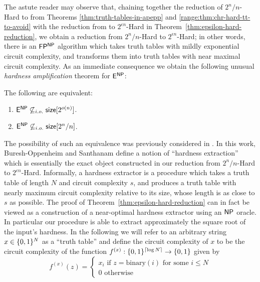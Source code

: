 The astute reader may observe that, chaining together the reduction of {\sc $2^{n}/n$-Hard} to \avoid from Theorems \ref{thm:truth-tables-in-apepp} and \ref{range:thm:chr-hard-tt-to-avoid} with the reduction from \avoid to {\sc $2^{\epsilon n}$-Hard} in Theorem~\ref{thm:epsilon-hard-reduction}, we obtain a reduction from {\sc $2^{n}/n$-Hard} to {\sc $2^{\epsilon n}$-Hard}; in other words, there is an $\cl{FP^{NP}}$ algorithm which takes truth tables with mildly exponential circuit complexity, and transforms them into truth tables with near maximal circuit complexity. As an immediate consequence we obtain the following unusual \emph{hardness amplification} theorem for $\cl{E^{NP}}$:
\begin{theorem}\label{thm:enp-amp}
The following are equivalent:
\begin{enumerate}
    \item $\cl{E^{NP}} \not\subseteq_{i.o.} \cl{size}[2^{o(n)}]$.
    \item  $\cl{E^{NP}} \not\subseteq_{i.o.} \cl{size}[2^{n}/n]$.
\end{enumerate}
\end{theorem}

The possibility of such an equivalence was previously considered in \cite{hardness-harder}. In this work, Buresh-Oppenheim and Santhanam define a notion of ``hardness extraction'' which is essentially the exact object constructed in our reduction from {\sc $2^{n}/n$-Hard} to {\sc $2^{\epsilon n}$-Hard}. Informally, a hardness extractor is a procedure which takes a truth table of length $N$ and circuit complexity $s$, and produces a truth table with nearly maximum circuit complexity relative to its size, whose length is as close to $s$ as possible. The proof of Theorem~\ref{thm:epsilon-hard-reduction} can in fact be viewed as a construction of a near-optimal hardness extractor using an $\cl{NP}$ oracle. In particular our procedure is able to extract approximately the square root of the input's hardness. 
In the following we will refer to an arbitrary string $x \in \{0,1\}^N$ as a ``truth table'' and define the circuit complexity of $x$ to be the circuit complexity of the function $f^{(x)}: \{0,1\}^{\lceil \log N \rceil} \to \{0,1\}$ given by 
\[
f^{(x)}(z) = \begin{cases}
x_i \text{ if } z=\mathrm{binary}(i) \text{ for some } i \leq N \\
0 \text{ otherwise}
\end{cases}
\]

